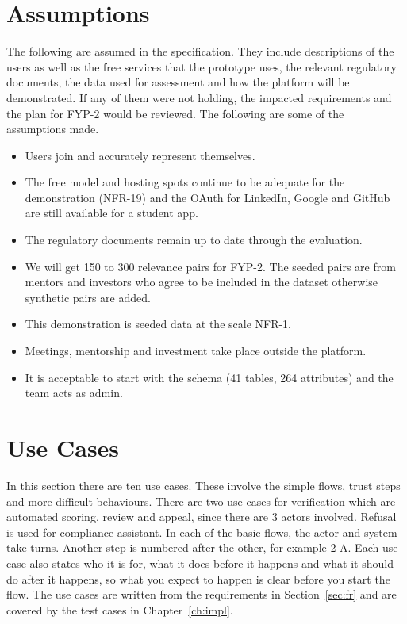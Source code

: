 \documentclass{FastFyp}
\begin{document}
\section{Assumptions}
The following are assumed in the specification. They include descriptions of the users as well as the free services that the prototype uses, the relevant regulatory documents, the data used for assessment and how the platform will be demonstrated. If any of them were not holding, the impacted requirements and the plan for FYP-2 would be reviewed. The following are some of the assumptions made.
\begin{itemize}
 \item Users join and accurately represent themselves.
 \item The free model and hosting spots continue to be adequate for the demonstration (NFR-19) and the OAuth for LinkedIn, Google and GitHub are still available for a student app.
 \item The regulatory documents remain up to date through the evaluation.
 \item We will get 150 to 300 relevance pairs for FYP-2. The seeded pairs are from mentors and investors who agree to be included in the dataset otherwise synthetic pairs are added.
 \item This demonstration is seeded data at the scale NFR-1.
 \item Meetings, mentorship and investment take place outside the platform.
 \item It is acceptable to start with the schema (41 tables, 264 attributes) and the team acts as admin.
\end{itemize}


\section{Use Cases}\label{sec:uc}
In this section there are ten use cases. These involve the simple flows, trust steps and more difficult behaviours. There are two use cases for verification which are automated scoring, review and appeal, since there are 3 actors involved. Refusal is used for compliance assistant. In each of the basic flows, the actor and system take turns. Another step is numbered after the other, for example 2-A. Each use case also states who it is for, what it does before it happens and what it should do after it happens, so what you expect to happen is clear before you start the flow. The use cases are written from the requirements in Section~\ref{sec:fr} and are covered by the test cases in Chapter~\ref{ch:impl}.
\end{document}
